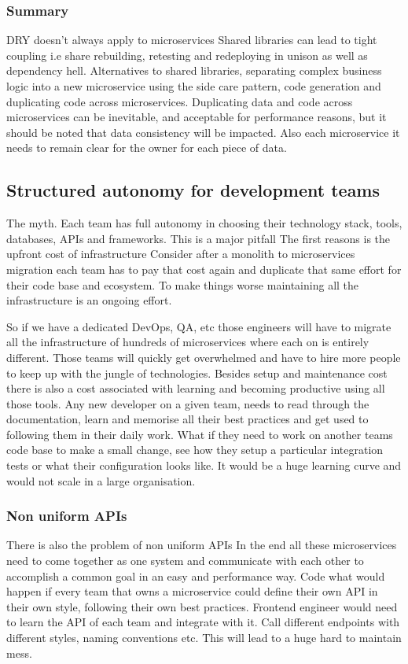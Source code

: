 \documentclass[a4paper, 11pt]{book}
\begin{document}
    \subsubsection{Summary}
    DRY doesn't always apply to microservices
    Shared libraries can lead to tight coupling i.e share rebuilding, retesting and redeploying in unison as well as dependency hell.
    Alternatives to shared libraries, separating complex business logic into a new microservice using the side care pattern, code generation and duplicating code across microservices.
    Duplicating data and code across microservices can be inevitable, and acceptable for performance reasons, but it should be noted that data consistency will be impacted.
    Also each microservice it needs to remain clear for the owner for each piece of data.

    \subsection{Structured autonomy for development teams}
    The myth.
    Each team has full autonomy in choosing their technology stack, tools, databases, APIs and frameworks.
    This is a major pitfall
    The first reasons is the upfront cost of infrastructure
    Consider after a monolith to microservices migration each team has to pay that cost again and duplicate that same effort for their code base and ecosystem.
    To make things worse maintaining all the infrastructure is an ongoing effort.

    So if we have a dedicated DevOps, QA, etc those engineers will have to migrate all the infrastructure of hundreds of microservices where each on is entirely different.
    Those teams will quickly get overwhelmed and have to hire more people to keep up with the jungle of technologies.
    Besides setup and maintenance cost there is also a cost associated with learning and becoming productive using all those tools.
    Any new developer on a given team, needs to read through the documentation, learn and memorise all their best practices and get used to following them in their daily work.
    What if they need to work on another teams code base to make a small change, see how they setup a particular integration tests or what their configuration looks like.
    It would be a huge learning curve and would not scale in a large organisation.

    \subsubsection{Non uniform APIs}
    There is also the problem of non uniform APIs
    In the end all these microservices need to come together as one system and communicate with each other to accomplish a common goal in an easy and performance way.
    Code what would happen if every team that owns a microservice could define their own API in their own style, following their own best practices.
    Frontend engineer would need to learn the API of each team and integrate with it.
    Call different endpoints with different styles, naming conventions etc.
    This will lead to a huge hard to maintain mess.
\end{document}
